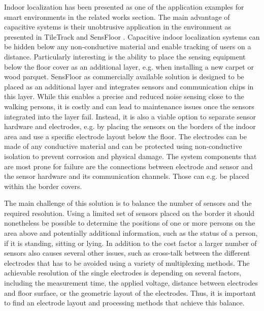 Indoor localization has been presented as one of the application examples for smart environments in the related works section. The main advantage of capacitive systems is their unobtrusive application in the environment as presented in TileTrack \cite{Valtonen2009a} and SensFloor \cite{lauterbach2009}. Capacitive indoor localization systems can be hidden below any non-conductive material and enable tracking of users on a distance. Particularly interesting is the ability to place the sensing equipment below the floor cover as an additional layer, e.g. when installing a new carpet or wood parquet. SensFloor as commercially available solution is designed to be placed as an additional layer and integrates sensors and communication chips in this layer. While this enables a precise and reduced noise sensing close to the walking persons, it is costly and can lead to maintenance issues once the sensors integrated into the layer fail. Instead, it is also a viable option to separate sensor hardware and electrodes, e.g. by placing the sensors on the borders of the indoor area and use a specific electrode layout below the floor. The electrodes can be made of any conductive material and can be protected using non-conductive isolation to prevent corrosion and physical damage. The system components that are most prone for failure are the connections between electrode and sensor and the sensor hardware and its communication channels. Those can e.g. be placed within the border covers.

The main challenge of this solution is to balance the number of sensors and the required resolution. Using a limited set of sensors placed on the border it should nonetheless be possible to determine the positions of one or more persons on the area above and potentially additional information, such as the status of a person, if it is standing, sitting or lying. In addition to the cost factor a larger number of sensors also causes several other issues, such as cross-talk between the different electrodes that has to be avoided using a variety of multiplexing methods. The achievable resolution of the single electrodes is depending on several factors, including the measurement time, the applied voltage, distance between electrodes and floor surface, or the geometric layout of the electrodes. Thus, it is important to find an electrode layout and processing methods that achieve this balance.

